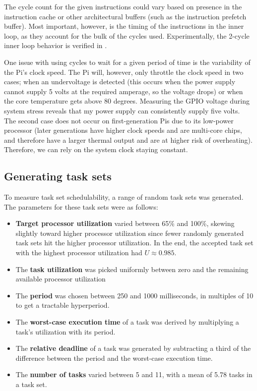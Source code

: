 The cycle count for the given instructions could vary based on presence in the instruction cache or other architectural buffers (such as the instruction prefetch buffer). Most important, however, is the timing of the instructions in the inner loop, as they account for the bulk of the cycles used. Experimentally, the 2-cycle inner loop behavior is verified in .

One issue with using cycles to wait for a given period of time is the variability of the Pi's clock speed. The Pi will, however, only throttle the clock speed in two cases; when an undervoltage is detected (this occurs when the power supply cannot supply 5 volts at the required amperage, so the voltage drops) or when the core temperature gets above 80 degrees\cite{rpi:gpuclockpower}. Measuring the GPIO voltage during system stress reveals that my power supply can consistently supply five volts. The second case does not occur on first-generation Pis due to its low-power processor (later generations have higher clock speeds and are multi-core chips, and therefore have a larger thermal output and are at higher risk of overheating). Therefore, we can rely on the system clock staying constant.

\subsection{Generating task sets}
To measure task set schedulability, a range of random task sets was generated. The parameters for these task sets were as follows:

\begin{itemize}
    \item \textbf{Target processor utilization} varied between 65\% and 100\%, skewing slightly toward higher processor utilization since fewer randomly generated task sets hit the higher processor utilization. In the end, the accepted task set with the highest processor utilization had $U \approx 0.985$.
    \item The \textbf{task utilization} was picked uniformly between zero and the remaining available processor utilization
    \item The \textbf{period} was chosen between 250 and 1000 milliseconds, in multiples of 10 to get a tractable hyperperiod.
    \item The \textbf{worst-case execution time} of a task was derived by multiplying a task's utilization with its period.
    \item The \textbf{relative deadline} of a task was generated by subtracting a third of the difference between the period and the worst-case execution time.
    \item The \textbf{number of tasks} varied between 5 and 11, with a mean of 5.78 tasks in a task set.
\end{itemize}

